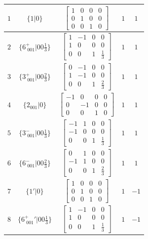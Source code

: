\documentclass[fleqn,8pt]{jsarticle}
\begin{document}
\begin{longtable}{ccccc}
$ 1 $ & $ \{1|0\} $ & $ \begin{bmatrix} 1 & 0 & 0 & 0 \\ 0 & 1 & 0 & 0 \\ 0 & 0 & 1 & 0 \end{bmatrix} $ & $ 1 $ & $ 1 $ \\ \hline
$ 2 $ & $ \{6^{+}_{\,\,001}|0 0 \frac{1}{3}\} $ & $ \begin{bmatrix} 1 & -1 & 0 & 0 \\ 1 & 0 & 0 & 0 \\ 0 & 0 & 1 & \frac{1}{3} \end{bmatrix} $ & $ 1 $ & $ 1 $ \\ \hline
$ 3 $ & $ \{3^{+}_{\,\,001}|0 0 \frac{2}{3}\} $ & $ \begin{bmatrix} 0 & -1 & 0 & 0 \\ 1 & -1 & 0 & 0 \\ 0 & 0 & 1 & \frac{2}{3} \end{bmatrix} $ & $ 1 $ & $ 1 $ \\ \hline
$ 4 $ & $ \{2{}_{001}|0\} $ & $ \begin{bmatrix} -1 & 0 & 0 & 0 \\ 0 & -1 & 0 & 0 \\ 0 & 0 & 1 & 0 \end{bmatrix} $ & $ 1 $ & $ 1 $ \\ \hline
$ 5 $ & $ \{3^{-}_{\,\,001}|0 0 \frac{1}{3}\} $ & $ \begin{bmatrix} -1 & 1 & 0 & 0 \\ -1 & 0 & 0 & 0 \\ 0 & 0 & 1 & \frac{1}{3} \end{bmatrix} $ & $ 1 $ & $ 1 $ \\ \hline
$ 6 $ & $ \{6^{-}_{\,\,001}|0 0 \frac{2}{3}\} $ & $ \begin{bmatrix} 0 & 1 & 0 & 0 \\ -1 & 1 & 0 & 0 \\ 0 & 0 & 1 & \frac{2}{3} \end{bmatrix} $ & $ 1 $ & $ 1 $ \\ \hline
$ 7 $ & $ \{1{}'|0\} $ & $ \begin{bmatrix} 1 & 0 & 0 & 0 \\ 0 & 1 & 0 & 0 \\ 0 & 0 & 1 & 0 \end{bmatrix} $ & $ 1 $ & $ -1 $ \\ \hline
$ 8 $ & $ \{6^{+}_{\,\,001}{}'|0 0 \frac{1}{3}\} $ & $ \begin{bmatrix} 1 & -1 & 0 & 0 \\ 1 & 0 & 0 & 0 \\ 0 & 0 & 1 & \frac{1}{3} \end{bmatrix} $ & $ 1 $ & $ -1 $ \\ \hline

\end{longtable}
\end{document}
